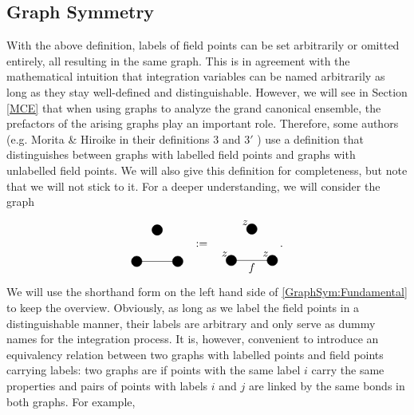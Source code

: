 \documentclass[8.5pt,twoside,twocolumn]{article}
\theoremstyle{standard}
\begin{document}
\subsection{Graph Symmetry}
\label{GraphSym}

With the above definition, labels of field points can be set arbitrarily or omitted entirely,
all resulting in the same graph. This is in agreement with the mathematical intuition that
integration variables can be named arbitrarily as long as they stay well-defined and
distinguishable. However, we will see in Section \ref{MCE} that when using graphs to
analyze the grand canonical ensemble, the prefactors of the arising graphs play an important
role. Therefore, some authors (e.g. Morita \& Hiroike in their definitions $3$ and $3'$ \cite{Hiroike})
use a definition that distinguishes between graphs with labelled field points and graphs with unlabelled
field points. We will also give this definition for completeness, but note that we will not stick to it.
For a deeper understanding, we will consider the graph
\newcommand\exgraph[3]{
  \draw(0,0) node[circle,minimum size=.2cm,draw,fill=black] (A) {};
  \draw(1.3,0) node[circle,minimum size=.2cm,draw,fill=black] (B) {};
  \draw(.65,1) node[circle,minimum size=.2cm,draw,fill=black] (C) {};
  \draw (A.center) -- (B.center);
  \node [below right] at (A) {#1};
  \node [below right] at (B) {#2};
  \node [below right] at (C) {#3};
  }
  \begin{equation}
\begin{tikzpicture}[baseline={(current bounding box.center)}]
  \exgraph{}{}{}
\end{tikzpicture} \ \ :=\ \ 
\begin{tikzpicture}[baseline={(current bounding box.center)}]
  \exgraph{}{}{}
  \node at (.65,-.25) {$f$};
  \node [above left] at (A) {$z$};
  \node [above left] at (B) {$z$};
  \node [above left] at (C) {$z$};
\end{tikzpicture}.
\label{GraphSym:Fundamental}
\end{equation}
We will use the shorthand form on the left hand side of \eqref{GraphSym:Fundamental} to
keep the overview. Obviously, as long as we label the field points in a
distinguishable manner, their labels are arbitrary and only serve as dummy names
for the integration process.
It is, however, convenient to introduce an equivalency relation between
two graphs with labelled points and field points carrying labels: two graphs are
\ep{topologically indistinguishable} if points with the same label $i$ carry the same properties and pairs of points with
labels $i$ and $j$ are linked by the same bonds in both graphs. For example,
\end{document}
